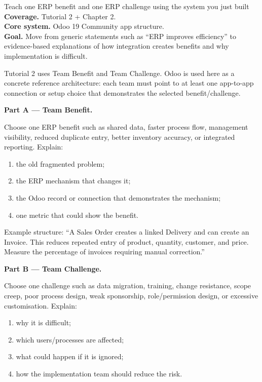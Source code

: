 
\begin{labproject}{Teach one ERP benefit and one ERP challenge using the system you just built}
\textbf{Coverage.} Tutorial 2 + Chapter 2.\\
\textbf{Core system.} Odoo 19 Community app structure.\\
\textbf{Goal.} Move from generic statements such as ``ERP improves efficiency'' to evidence-based explanations of how integration creates benefits and why implementation is difficult.

\begin{labmode}
Tutorial 2 uses Team Benefit and Team Challenge. Odoo is used here as a concrete reference architecture: each team must point to at least one app-to-app connection or setup choice that demonstrates the selected benefit/challenge.
\end{labmode}

\medskip\noindent\textbf{Part A --- Team Benefit.}

Choose one ERP benefit such as shared data, faster process flow, management visibility, reduced duplicate entry, better inventory accuracy, or integrated reporting. Explain:
\begin{enumerate}
  \item the old fragmented problem;
  \item the ERP mechanism that changes it;
  \item the Odoo record or connection that demonstrates the mechanism;
  \item one metric that could show the benefit.
\end{enumerate}

Example structure: ``A Sales Order creates a linked Delivery and can create an Invoice. This reduces repeated entry of product, quantity, customer, and price. Measure the percentage of invoices requiring manual correction.''

\medskip\noindent\textbf{Part B --- Team Challenge.}

Choose one challenge such as data migration, training, change resistance, scope creep, poor process design, weak sponsorship, role/permission design, or excessive customisation. Explain:
\begin{enumerate}
  \item why it is difficult;
  \item which users/processes are affected;
  \item what could happen if it is ignored;
  \item how the implementation team should reduce the risk.
\end{enumerate}


\end{labproject}
